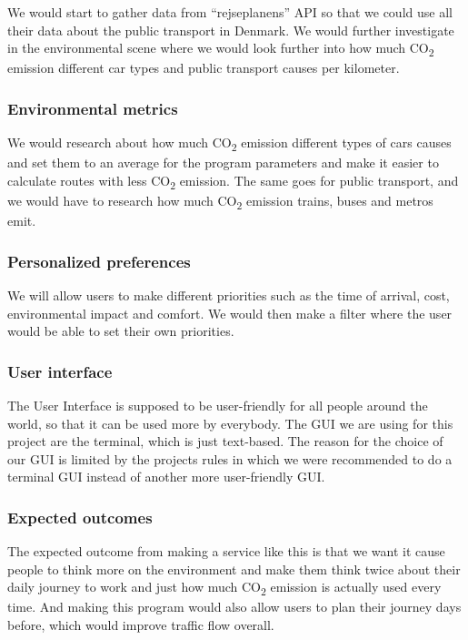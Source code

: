 We would start to gather data from ``rejseplanens'' API so that we could use all their data about the public transport
in Denmark.
We would further investigate in the environmental scene where we would look further into how much \unit{CO_{2}} emission
different car types and public transport causes per kilometer.

\subsubsection{Environmental metrics}

We would research about how much \unit{CO_{2}} emission different types of cars causes and set them to an average for
the program parameters and make it easier to calculate routes with less \unit{CO_{2}} emission.
The same goes for public transport, and we would have to research how much \unit{CO_{2}} emission trains, buses and
metros emit.

\subsubsection{Personalized preferences}

We will allow users to make different priorities such as the time of arrival, cost, environmental impact and comfort.
We would then make a filter where the user would be able to set their own priorities.

\subsubsection{User interface}

The User Interface is supposed to be user-friendly for all people around the world, so that it can be used more by
everybody.
The GUI we are using for this project are the terminal, which is just text-based.
The reason for the choice of our GUI is limited by the projects rules in which we were recommended to do a terminal GUI
instead of another more user-friendly GUI\@.

\subsubsection{Expected outcomes}
The expected outcome from making a service like this is that we want it cause people to think more on the environment
and make them think twice about their daily journey to work and just how much \unit{CO_{2}} emission is actually used
every time.
And making this program would also allow users to plan their journey days before, which would improve traffic flow
overall.
